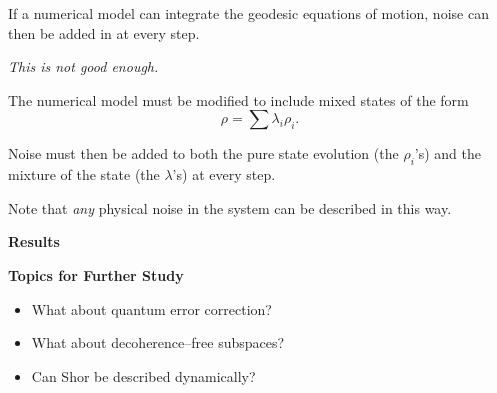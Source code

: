 \documentclass{slides}
\begin{document}
If a numerical model can integrate the geodesic equations of
motion, noise can then be added in at every step.

\vfil
\begin{center}
{\sl This is not good enough.}
\end{center}

\pagebreak

The numerical model must be modified to include 
mixed states of the form
\begin{equation*}
\rho = \sum\lambda_i\rho_i.
\end{equation*}

Noise must then be added to both the pure state 
evolution (the $\rho_i$'s) and the mixture of 
the state (the $\lambda$'s) at every step.

Note that \emph{any} physical noise in the system can be 
described in this way.


\pagebreak


\begin{center}
\textbf{Results}
\end{center}

\begin{center}
\end{center}

\begin{center}
\end{center}


\pagebreak


\begin{center}
\textbf{Topics for Further Study}
\end{center}

\begin{itemize}
\item What about quantum error correction?
\item What about decoherence--free subspaces?
\item Can Shor be described dynamically?
\end{itemize}
\end{document}
